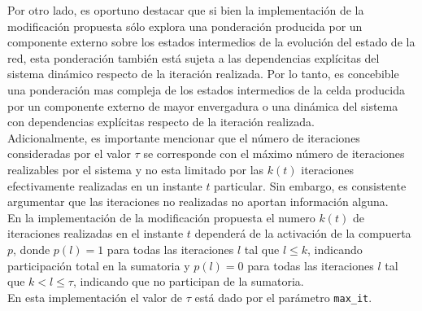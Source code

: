 \documentclass{article}
\begin{document}
	Por otro lado, es oportuno destacar que si bien la implementación de la modificación propuesta sólo explora una ponderación producida por un componente externo sobre los estados intermedios de la evolución del estado de la red, esta ponderación también está sujeta a las dependencias explícitas del sistema dinámico respecto de la iteración realizada. Por lo tanto, es concebible una ponderación mas compleja de los estados intermedios de la celda producida por un componente externo de mayor envergadura o una dinámica del sistema con dependencias explícitas respecto de la iteración realizada.\\
	
	Adicionalmente, es importante mencionar que el número de iteraciones consideradas por el valor $\tau$ se corresponde con el máximo número de iteraciones realizables por el sistema y no esta limitado por las $k(t)$ iteraciones efectivamente realizadas en un instante $t$ particular. Sin embargo, es consistente argumentar que las iteraciones no realizadas no aportan información alguna.\\
	En la implementación de la modificación propuesta el numero $k(t)$ de iteraciones realizadas en el instante $t$ dependerá de la activación de la compuerta $p$, donde $p(l) = 1$ para todas las iteraciones $l$ tal que $l \le k$, indicando participación total en la sumatoria y $p(l) = 0$ para todas las iteraciones $l$ tal que $k < l \le \tau$, indicando que no participan de la sumatoria.\\
	En esta implementación el valor de $\tau$ está dado por el parámetro \texttt{max\_it}.
	
\end{document}
